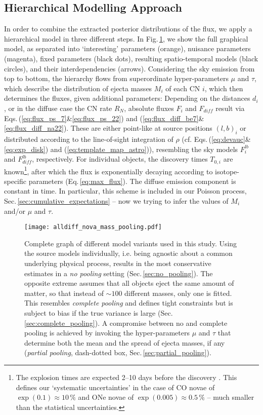 \documentclass{aa}
\begin{document}
\subsection{Hierarchical Modelling Approach}\label{sec:hierarchical_models}
%
In order to combine the extracted posterior distributions of the flux, we apply a hierarchical model \citep{Gelman2013_BDA3} in three different steps.
%
In Fig.\,\ref{fig:model_graphical}, we show the full graphical model, as separated into `interesting' parameters (orange), nuisance parameters (magenta), fixed parameters (black dots), resulting spatio-temporal models (black circles), and their interdependencies (arrows).
%
Considering the sky emission from top to bottom, the hierarchy flows from superordinate hyper-parameters $\mu$ and $\tau$, which describe the distribution of ejecta masses $M_i$ of each CN $i$, which then determines the fluxes, given additional parameters:
%
Depending on the distances $d_i$, or in the diffuse case the CN rate $R_N$, absolute fluxes $F_i$ and $F_{diff}$ result via Eqs.\,(\ref{eq:flux_ps_7}\&\ref{eq:flux_ps_22}) and (\ref{eq:flux_diff_be7}\&\ref{eq:flux_diff_na22}).
%
These are either point-like at source positions $(l,b)_i$ or distributed according to the line-of-sight integration of $\rho$ (cf. Eqs.\,(\ref{eq:devauc}\&\ref{eq:exp_disk}) and (\ref{eq:template_map_astro})), resembling the sky models $F_{i}^{lb}$ and $F_{diff}^{lb}$, respectively.
%
For individual objects, the discovery times $T_{0,i}$ are known\footnote{The explosion times are expected 2--10 days before the discovery \citep{Gomez-Gomar1998_novae}.
%
This defines our `systematic uncertainties' in the case of CO novae of $\exp(0.1) \approx 10\,\%$ and ONe novae of $\exp(0.005) \approx 0.5\,\%$ -- much smaller than the statistical uncertainties.}, after which the flux is exponentially decaying according to isotope-specific parameters (Eq.\,\ref{eq:max_flux}).
%
The diffuse emission component is constant in time.
%
In particular, this scheme is included in our Poisson process, Sec.\,\ref{sec:cumulative_expectations} -- now we trying to infer the values of $M_i$ and/or $\mu$ and $\tau$.

\begin{figure}[!htbp]
	\centering
	\texttt{[image: alldiff\_nova\_mass\_pooling.pdf]}
	\caption{Complete graph of different model variants used in this study. Using the source models individually, i.e. being agnostic about a common underlying physical process, results in the most conservative estimates in a \textit{no pooling} setting (Sec.\,\ref{sec:no_pooling}). The opposite extreme assumes that all objects eject the same amount of matter, so that instead of $\sim 100$ different masses, only one is fitted. This resembles \textit{complete pooling} and defines tight constraints but is subject to bias if the true variance is large (Sec.\,\ref{sec:complete_pooling}). A compromise between no and complete pooling is achieved by invoking the hyper-parameters $\mu$ and $\tau$ that determine both the mean and the spread of ejecta masses, if any (\textit{partial pooling}, dash-dotted box, Sec.\,\ref{sec:partial_pooling}).}
	\label{fig:model_graphical}
\end{figure}
\end{document}
